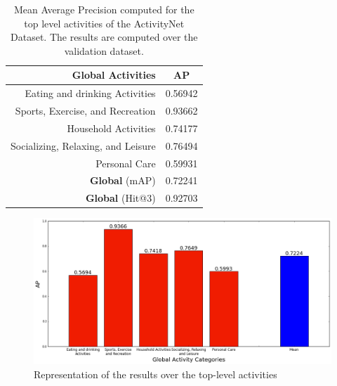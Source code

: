 \begin{table}[H]
\begin{center}
\begin{tabular}{|r|c|}
\hline
\textbf{Global Activities} & \textbf{AP} \\
\hline\hline
Eating and drinking Activities & 0.56942 \\
Sports, Exercise, and Recreation & 0.93662 \\
Household Activities & 0.74177 \\
Socializing, Relaxing, and Leisure & 0.76494 \\
Personal Care & 0.59931 \\
\hline\hline
\textbf{Global} (mAP) & 0.72241 \\
\textbf{Global} (Hit@3) & 0.92703 \\
\hline
\end{tabular}
\end{center}
\caption{Mean Average Precision computed for the top level activities of the ActivityNet Dataset. The results are computed over the validation dataset.}
\label{table:top_level_classification_ap}
\end{table}

\begin{figure}[H]
\begin{center}
\includegraphics[width=1\linewidth]{img/results/top_activities_classification_ap}
\end{center}
\caption{Representation of the results over the top-level activities}
\label{fig:top_level_classification_ap}
\end{figure}




